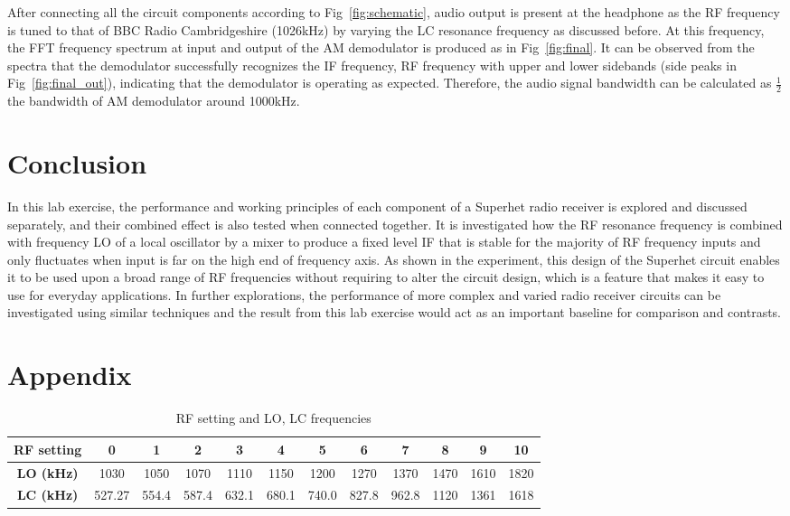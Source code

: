 \documentclass[a4paper,12pt]{article}
\begin{document}
After connecting all the circuit components according to Fig~\ref{fig:schematic}, audio output is present at the headphone as the RF frequency is tuned to that of BBC Radio Cambridgeshire (1026kHz) by varying the LC resonance frequency as discussed before.
At this frequency, the FFT frequency spectrum at input and output of the AM demodulator is produced as in Fig~\ref{fig:final}.
It can be observed from the spectra that the demodulator successfully recognizes the IF frequency, RF frequency with upper and lower sidebands (side peaks in Fig~\ref{fig:final_out}), indicating that the demodulator is operating as expected.
Therefore, the audio signal bandwidth can be calculated as $\frac{1}{2}$ the bandwidth of AM demodulator around 1000kHz.

\section{Conclusion}
In this lab exercise, the performance and working principles of each component of a Superhet radio receiver is explored and discussed separately, and their combined effect is also tested when connected together.
It is investigated how the RF resonance frequency is combined with frequency LO of a local oscillator by a mixer to produce a fixed level IF that is stable for the majority of RF frequency inputs and only fluctuates when input is far on the high end of frequency axis.
As shown in the experiment, this design of the Superhet circuit enables it to be used upon a broad range of RF frequencies without requiring to alter the circuit design, which is a feature that makes it easy to use for everyday applications.
In further explorations, the performance of more complex and varied radio receiver circuits can be investigated using similar techniques and the result from this lab exercise would act as an important baseline for comparison and contrasts.

\section{Appendix}
\begin{table}[H]
    \centering
    \caption{RF setting and LO, LC frequencies}
    \label{tab:frequencies}
    \begin{tabular}{|c|c|c|c|c|c|c|c|c|c|c|c|}
    \hline
    \textbf{RF setting} & 0 & 1 & 2 & 3 & 4 & 5 & 6 & 7 & 8 & 9 & 10 \\ \hline
    \textbf{LO (kHz)} & 1030 & 1050 & 1070 & 1110 & 1150 & 1200 & 1270 & 1370 & 1470 & 1610 & 1820 \\ \hline
    \textbf{LC (kHz)} & 527.27 & 554.4 & 587.4 & 632.1 & 680.1 & 740.0 & 827.8 & 962.8 & 1120 & 1361 & 1618 \\ \hline
    \end{tabular}
\end{table}
\end{document}
